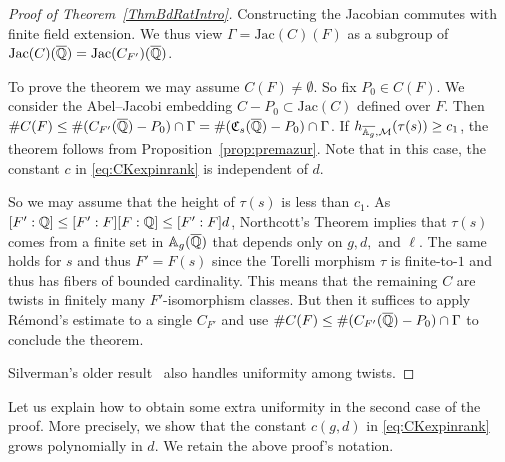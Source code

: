 \begin{proof}[Proof of Theorem~\ref{ThmBdRatIntro}]
  Constructing the
  Jacobian commutes with finite field extension. We thus view 
  $\Gamma = \mathrm{Jac}(C)(F)$ as a subgroup of $\mathrm{Jac}(C)({\overline{\mathbb{Q}}})
  = \mathrm{Jac}(C_{F'})({\overline{\mathbb{Q}}})$. 


  To prove the theorem we may assume $C(F)\not=\emptyset$. So fix
  $P_0\in C(F)$. We consider the Abel--Jacobi embedding
  $C-P_0\subset \mathrm{Jac}(C)$ defined over $F$. Then $\# C(F)\le \#
  (C_{F'}({\overline{\mathbb{Q}}})-P_0)\cap\Gamma = \#
  (\mathfrak{C}_s({\overline{\mathbb{Q}}})-P_0)\cap \Gamma$. If
  $h_{\overline{\mathbb{A}_g},{\mathcal M}}(\tau(s))\ge c_1$, the theorem
  follows from Proposition~\ref{prop:premazur}. 
  Note that in this case, the constant $c$ in \eqref{eq:CKexpinrank} is independent of $d$.

  So we may assume that the height 
  of $\tau(s)$ is less than $c_1$. 
  As $[F':{\mathbb{Q}}]\le [F':F][F:{\mathbb{Q}}]\le [F':F]d$,
  Northcott's Theorem implies
 that $\tau(s)$ comes   from a finite set in $\mathbb{A}_{g}({\overline{\mathbb{Q}}})$
 that depends only on $g,d,$ and $\ell$. The same holds for $s$ and
 thus $F'=F(s)$
 since the Torelli morphism $\tau$ is finite-to-$1$ and thus   has
 fibers of bounded cardinality. %
 This means that the remaining $C$ are twists   in
 finitely many $F'$-isomorphism classes. But then it suffices to
 apply R\'emond's estimate \cite[page 643]{DPvarabII} to a single
 $C_{F'}$ and    use $\#C(F) \le \# (C_{F'}({\overline{\mathbb{Q}}})-P_0)\cap\Gamma$ to
 conclude the theorem. %

Silverman's older result~\cite[Theorem 1]{Silverman:twists} also
 handles uniformity among twists.
\end{proof}

Let us explain how to obtain some extra uniformity in the second case
of the proof. More precisely, we show that the constant $c(g,d)$ in
\eqref{eq:CKexpinrank} grows polynomially in $d$. We retain the above
proof's notation.%

